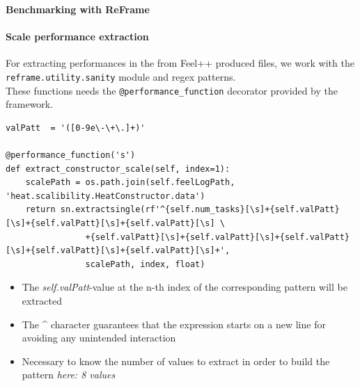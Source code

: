 \documentclass[10pt]{beamer}
\begin{document}
\begin{frame}[fragile]{\textbf{Benchmarking with ReFrame}}
    \framesubtitle{\textbf{Scale performance extraction}}
    \begin{small}
    For extracting performances in the from Feel++ produced files, we work with the \texttt{reframe.utility.sanity} module and regex patterns. \\
    These functions needs the \texttt{@performance\_function} decorator provided by the framework.
    \end{small}
    \begin{tiny}
    \begin{verbatim}
valPatt  = '([0-9e\-\+\.]+)'

@performance_function('s')
def extract_constructor_scale(self, index=1):
    scalePath = os.path.join(self.feelLogPath, 'heat.scalibility.HeatConstructor.data')
    return sn.extractsingle(rf'^{self.num_tasks}[\s]+{self.valPatt}[\s]+{self.valPatt}[\s]+{self.valPatt}[\s] \
                +{self.valPatt}[\s]+{self.valPatt}[\s]+{self.valPatt}[\s]+{self.valPatt}[\s]+{self.valPatt}[\s]+',
                scalePath, index, float)
    \end{verbatim}
    \end{tiny}

    \begin{itemize}
        \item The \textit{self.valPatt}-value at the n-th index of the corresponding pattern will be extracted
        \item The \^{} character guarantees that the expression starts on a new line for avoiding any unintended interaction
        \item Necessary to know the number of values to extract in order to build the pattern \textit{here: 8 values}
    \end{itemize}

\end{frame}
\end{document}
